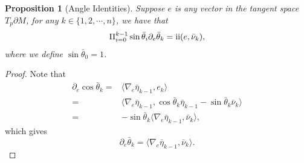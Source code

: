\documentclass[11pt,letterpaper]{amsart}
\newcommand{\RN}[1]{%
  \textup{\uppercase\expandafter{\romannumeral#1}}%
}
\newtheorem{prop}{Proposition}[section]
\begin{document}
\begin{prop}[Angle Identities]\label{prop: Angle Identities}
Suppose $e$ is any vector in the tangent space $T_p\partial M$, for any $k\in \{1,2,\cdots,n\}$, we have that
\begin{align}
    \Pi_{i=0}^{k-1}\sin\bar{\theta}_i\partial_{e}\bar{\theta}_k=\RN{2}(e,\bar{\nu}_k),
\end{align}
    where we define $\sin\bar{\theta}_0=1$.
\end{prop}
\begin{proof}
    Note that
    \begin{align*}
        \partial_{e}\cos\bar{\theta}_k=&\langle \nabla_{e}\bar{\eta}_{k-1},e_k\rangle\\
        =&\langle \nabla_e\bar{\eta}_{k-1},\cos\bar{\theta}_k\bar{\eta}_{k-1}-\sin\bar{\theta}_k\bar{\nu}_k\rangle\\
        =&-\sin\bar{\theta}_k\langle \nabla_{e}\bar{\eta}_{k-1},\bar{\nu}_k\rangle,
    \end{align*}
     which gives
     \[
     \partial_{e}\bar{\theta}_k=\langle \nabla_e\bar{\eta}_{k-1},\bar{\nu}_k\rangle.
     \]
    

\end{proof}
\end{document}
